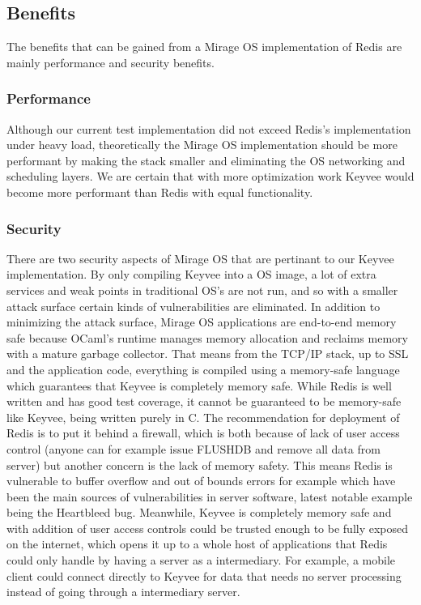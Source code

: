 \documentclass[english,10pt,twocolumn]{article}
\begin{document}
\subsection{Benefits}

The benefits that can be gained from a Mirage OS implementation of Redis are mainly performance and security benefits.

\subsubsection{Performance}

Although our current test implementation did not exceed Redis's implementation under heavy load, theoretically the Mirage OS implementation should be more performant by making the stack smaller and eliminating the OS networking and scheduling layers. We are certain that with more optimization work Keyvee would become more performant than Redis with equal functionality.

\subsubsection{Security}

There are two security aspects of Mirage OS that are pertinant to our Keyvee implementation.
By only compiling Keyvee into a OS image, a lot of extra services and weak points in traditional OS's are not run, and so with a smaller attack surface certain kinds of vulnerabilities are eliminated.
In addition to minimizing the attack surface, Mirage OS applications are end-to-end memory safe because OCaml's runtime manages memory allocation and reclaims memory with a mature garbage collector.
That means from the TCP/IP stack, up to SSL and the application code, everything is compiled using a memory-safe language which guarantees that Keyvee is completely memory safe.
While Redis is well written and has good test coverage, it cannot be guaranteed to be memory-safe like Keyvee, being written purely in C.
The recommendation for deployment of Redis is to put it behind a firewall, which is both because of lack of user access control (anyone can for example issue FLUSHDB and remove all data from server) but another concern is the lack of memory safety.
This means Redis is vulnerable to buffer overflow and out of bounds errors for example which have been the main sources of vulnerabilities in server software, latest notable example being the Heartbleed bug.
Meanwhile, Keyvee is completely memory safe and with addition of user access controls could be trusted enough to be fully exposed on the internet, which opens it up to a whole host of applications that Redis could only handle by having a server as a intermediary.
For example, a mobile client could connect directly to Keyvee for data that needs no server processing instead of going through a intermediary server.
\end{document}
